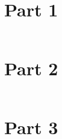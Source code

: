 \documentclass{article}
\begin{document}
\section{Part 1}
\inputminted{C}{part1_lab1.c}
\newpage
\section{Part 2}
\inputminted{C}{part2_lab1.c}
\newpage
\section{Part 3}
\inputminted{C}{part3_lab1.c}
\end{document}
